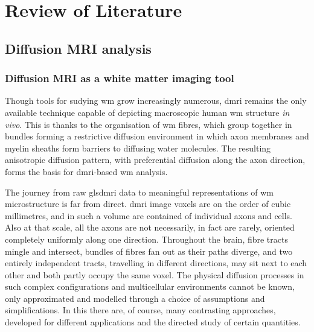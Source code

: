 \chapter{Review of Literature}
\label{review}



\section{Diffusion MRI analysis}


\subsection{Diffusion MRI as a white matter imaging tool}

Though tools for sudying \gls{wm} grow increasingly numerous, \gls{dmri} remains the only available technique capable of depicting macroscopic  human \gls{wm} structure \textit{in vivo}.
This is thanks to the  organisation of \gls{wm} fibres, which group together in bundles forming a restrictive diffusion environment in which axon membranes and myelin sheaths form barriers to diffusing water molecules.
The resulting anisotropic diffusion pattern, with preferential diffusion along the axon direction, forms the basis for \gls{dmri}-based \gls{wm} analysis.

The journey from raw glsdmri data to meaningful representations of \gls{wm} microstructure is far from direct.
\Gls{dmri} image \glspl{voxel} are on the order of cubic millimetres, and in such a volume are contained  of individual axons and cells.
Also at that scale, all the axons are not necessarily, in fact are rarely, oriented completely uniformly along one direction.
Throughout the brain, fibre tracts mingle and intersect, bundles of fibres fan out as their paths diverge, and two entirely independent tracts, travelling in different directions, may sit next to each other and both partly occupy the same voxel.
The physical diffusion processes in such complex configurations and multicellular environments cannot be known, only approximated and modelled through a choice of assumptions and simplifications.
In this there are, of course, many contrasting approaches, developed for different applications and the directed study of certain quantities.

